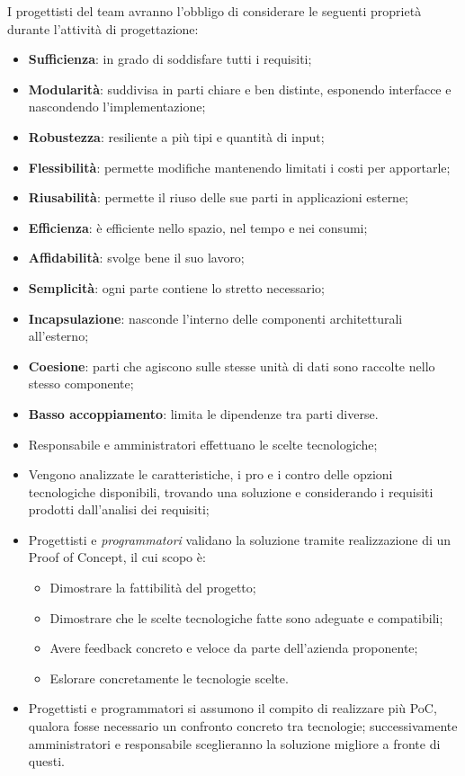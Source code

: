 \documentclass[10pt, a4paper]{article}
\begin{document}
I progettisti del team avranno l'obbligo di considerare le seguenti proprietà durante l'attività di progettazione:
\begin{itemize}
    \item \textbf{Sufficienza}: in grado di soddisfare tutti i requisiti;
    \item \textbf{Modularità}: suddivisa in parti chiare e ben distinte, esponendo interfacce e nascondendo l'implementazione;
    \item \textbf{Robustezza}: resiliente a più tipi e quantità di input;
    \item \textbf{Flessibilità}: permette modifiche mantenendo limitati i costi per apportarle;
    \item \textbf{Riusabilità}: permette il riuso delle sue parti in applicazioni esterne;
    \item \textbf{Efficienza}: è efficiente nello spazio, nel tempo e nei consumi;
    \item \textbf{Affidabilità}: svolge bene il suo lavoro;
    \item \textbf{Semplicità}: ogni parte contiene lo stretto necessario;
    \item \textbf{Incapsulazione}: nasconde l'interno delle componenti architetturali all'esterno;
    \item \textbf{Coesione}: parti che agiscono sulle stesse unità di dati sono raccolte nello stesso componente;
    \item \textbf{Basso accoppiamento}: limita le dipendenze tra parti diverse.
\end{itemize}

\begin{itemize}
    \item Responsabile e amministratori effettuano le scelte tecnologiche;
    \item Vengono analizzate le caratteristiche, i pro e i contro delle opzioni tecnologiche disponibili, trovando una soluzione e considerando i requisiti prodotti dall'analisi dei requisiti;
    \item Progettisti e \textit{programmatori\pg} validano la soluzione tramite realizzazione di un Proof of Concept, il cui scopo è:
    \begin{itemize}
        \item Dimostrare la fattibilità del progetto;
        \item Dimostrare che le scelte tecnologiche fatte sono adeguate e compatibili;
        \item Avere feedback concreto e veloce da parte dell'azienda proponente;
        \item Eslorare concretamente le tecnologie scelte.
    \end{itemize}
    \item Progettisti e programmatori si assumono il compito di realizzare più PoC, qualora fosse necessario un confronto concreto tra tecnologie; successivamente amministratori e responsabile sceglieranno la soluzione migliore a fronte di questi.
\end{itemize}
\end{document}
